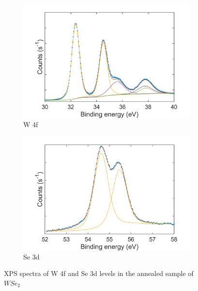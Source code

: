 \begin{figure}[!h]
	\begin{center}
		\begin{subfigure}[b]{1\textwidth}
			\includegraphics[scale=0.35]{1T'/XPSW4fAnn.png}
			\caption{W 4f}
			\label{fig:1T'XPSW4fAnnSpectrum}
		\end{subfigure}
		\qquad
		\begin{subfigure}[b]{1\textwidth}
			\includegraphics[scale=0.35]{1T'/XPSSe3dAnn.png}
			\caption{Se 3d}
			\label{fig:1T'XPSSe3dAnnSpectrum}
		\end{subfigure}
		\caption{XPS spectra of W 4f and Se 3d levels in the annealed sample of $WSe_2$}
		\label{fig:1T'XPSAnnSpectra}
	\end{center}
\end{figure}

